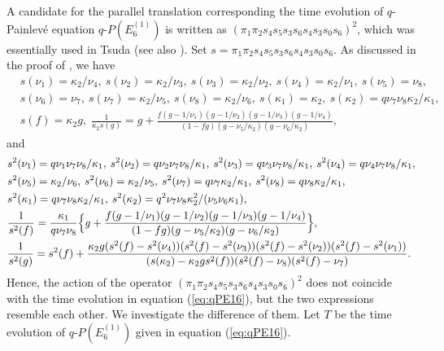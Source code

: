 \documentclass[12pt]{amsart}
\numberwithin{equation}{section}
\theoremstyle{definition}
\begin{document}
A candidate for the parallel translation corresponding the time evolution of $q$-Painlev\'e equation $q$-$P(E^{(1)}_6)$ is written as $(\pi _1 \pi _2 s_4 s_5 s_3 s_6 s_4 s_3 s_0 s_6 )^2 $, which was essentially used in Tsuda \cite{Td} (see also \cite{TsqP}).
Set $s= \pi _1 \pi _2 s_4 s_5 s_3 s_6 s_4 s_3 s_0 s_6 $.
As discussed in the proof of \cite[Theorem 3.1]{TsqP}, we have
\begin{align}
& s (\nu_1) = \kappa_2 /\nu_4 , \: s (\nu_2) =\kappa_2 /\nu_3 , \: s (\nu_3) = \kappa_2/\nu_2  , \: s (\nu_4) = \kappa_2/\nu_1,  \: s (\nu_5) = \nu_8 , \\
& s (\nu_6) =\nu_7 , \: s (\nu_7 ) = \kappa_2 /\nu_5, \: s (\nu_8 ) = \kappa_2 /\nu_6 , \: s (\kappa _1 ) = \kappa_2 , \: s  (\kappa _2 ) =  q  \nu_7 \nu_8 \kappa_2 / \kappa_1 ,  \nonumber \\
& s (f)  = \kappa_2 g , \; \frac{1}{\kappa_2 s (g)}  = g +\frac{f(g -1/\nu_1)(g -1/\nu_2)(g -1/\nu_3)(g -1/\nu_4)}{(1-fg)(g-\nu_5/\kappa_2)(g-\nu_6/\kappa_2)} , \nonumber
\end{align}
and 
\begin{align}
& s ^2 (\nu_1) = q \nu_1 \nu_7 \nu_8 /\kappa_1 , \: s^2 (\nu_2) = q \nu_2 \nu_7 \nu_8 /\kappa_1 , \: s^2 (\nu_3) = q \nu_3 \nu_7 \nu_8 / \kappa_1  , \: s ^2  (\nu_4) =  q \nu_4 \nu_7 \nu_8 / \kappa_1 , \label{eq:s^2E6} \\
& s^2 (\nu_5) = \kappa_2 /\nu_6 , \: s^2 (\nu_6) =\kappa_2 / \nu_5  , \: s^2 (\nu_7 ) = q \nu_7 \kappa_2 / \kappa_1 , \: s ^2(\nu_8 ) =q \nu_8 \kappa_2 / \kappa_1 , \nonumber \\
& s ^2 (\kappa _1 ) =  q \nu_7 \nu_8 \kappa_2/ \kappa_1  , \: s ^2 (\kappa _2 ) = q ^2 \nu_7 \nu_8 \kappa_2^2 /(\nu_5 \nu_6 \kappa_1 ) , \nonumber \\
& \frac{1}{s^2 (f)}   =  \frac{ \kappa_1}{ q  \nu_7 \nu_8 } \Bigl\{ g +\frac{f(g -1/\nu_1)(g -1/\nu_2)(g -1/\nu_3)(g -1/\nu_4)}{(1-fg)(g-\nu_5/\kappa_2)(g-\nu_6/\kappa_2)} \Bigr\}  , \nonumber \\
& \frac{1}{s^2 (g)}  = s^2 (f ) + \frac{\kappa_2  g ( s^2 (f )  - s^2 (\nu_4))( s^2 (f )  -s^2 (\nu_3 ))( s^2 (f )  - s^2 (\nu_2))( s^2 (f )  -s^2(\nu_1))}{ (s(\kappa _2 )- \kappa_2  g  s^2 (f ))( s^2 (f ) - \nu_8 )( s^2 (f ) - \nu_7 )} . \nonumber 
\end{align}
Hence, the action of the operator $(\pi _1 \pi _2 s_4 s_5 s_3 s_6 s_4 s_3 s_0 s_6 )^2 $ does not coincide with the time evolution in equation (\ref{eq:qPE16}), but the two expressions resemble each other.
We investigate the difference of them.
Let $T$ be the time evolution of $q$-$P(E^{(1)}_6)$ given in equation (\ref{eq:qPE16}).
\end{document}
